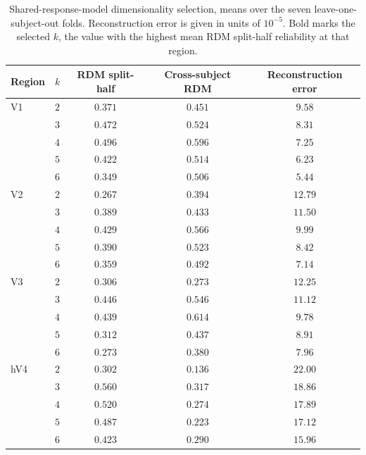 \begin{table}[h]
\centering
\caption{Shared-response-model dimensionality selection, means over the seven leave-one-subject-out folds. Reconstruction error is given in units of $10^{-5}$. Bold marks the selected $k$, the value with the highest mean RDM split-half reliability at that region.}
\label{tab:kselect}
\small
\begin{tabular}{llccc}
\toprule
Region & $k$ & RDM split-half & Cross-subject RDM & Reconstruction error \\
\midrule
V1  & $2$ & $0.371$ & $0.451$ & $9.58$ \\
    & $3$ & $0.472$ & $0.524$ & $8.31$ \\
    & $4$ & $\mathbf{0.496}$ & $0.596$ & $7.25$ \\
    & $5$ & $0.422$ & $0.514$ & $6.23$ \\
    & $6$ & $0.349$ & $0.506$ & $5.44$ \\
\addlinespace
V2  & $2$ & $0.267$ & $0.394$ & $12.79$ \\
    & $3$ & $0.389$ & $0.433$ & $11.50$ \\
    & $4$ & $\mathbf{0.429}$ & $0.566$ & $9.99$ \\
    & $5$ & $0.390$ & $0.523$ & $8.42$ \\
    & $6$ & $0.359$ & $0.492$ & $7.14$ \\
\addlinespace
V3  & $2$ & $0.306$ & $0.273$ & $12.25$ \\
    & $3$ & $\mathbf{0.446}$ & $0.546$ & $11.12$ \\
    & $4$ & $0.439$ & $0.614$ & $9.78$ \\
    & $5$ & $0.312$ & $0.437$ & $8.91$ \\
    & $6$ & $0.273$ & $0.380$ & $7.96$ \\
\addlinespace
hV4 & $2$ & $0.302$ & $0.136$ & $22.00$ \\
    & $3$ & $\mathbf{0.560}$ & $0.317$ & $18.86$ \\
    & $4$ & $0.520$ & $0.274$ & $17.89$ \\
    & $5$ & $0.487$ & $0.223$ & $17.12$ \\
    & $6$ & $0.423$ & $0.290$ & $15.96$ \\
\bottomrule
\end{tabular}
\end{table}


